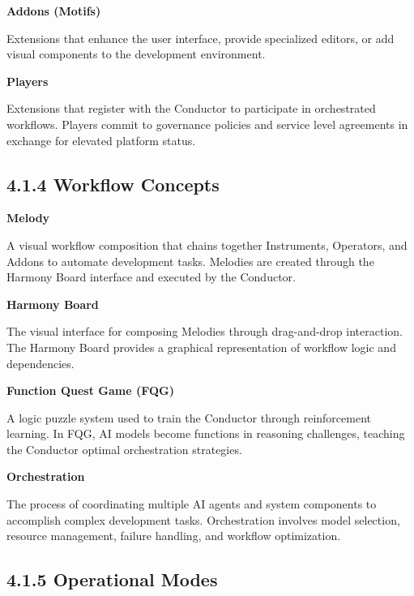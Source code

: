 \noindent\textbf{Addons (Motifs)}

Extensions that enhance the user interface, provide specialized editors, or add visual components to the development environment.

\vspace{0.3cm}

\noindent\textbf{Players}

Extensions that register with the Conductor to participate in orchestrated workflows. Players commit to governance policies and service level agreements in exchange for elevated platform status.

\subsection*{4.1.4 Workflow Concepts}

\vspace{0.3cm}

\noindent\textbf{Melody}

A visual workflow composition that chains together Instruments, Operators, and Addons to automate development tasks. Melodies are created through the Harmony Board interface and executed by the Conductor.

\vspace{0.3cm}

\noindent\textbf{Harmony Board}

The visual interface for composing Melodies through drag-and-drop interaction. The Harmony Board provides a graphical representation of workflow logic and dependencies.

\vspace{0.3cm}

\noindent\textbf{Function Quest Game (FQG)}

A logic puzzle system used to train the Conductor through reinforcement learning. In FQG, AI models become functions in reasoning challenges, teaching the Conductor optimal orchestration strategies.

\vspace{0.3cm}

\noindent\textbf{Orchestration}

The process of coordinating multiple AI agents and system components to accomplish complex development tasks. Orchestration involves model selection, resource management, failure handling, and workflow optimization.

\subsection*{4.1.5 Operational Modes}

